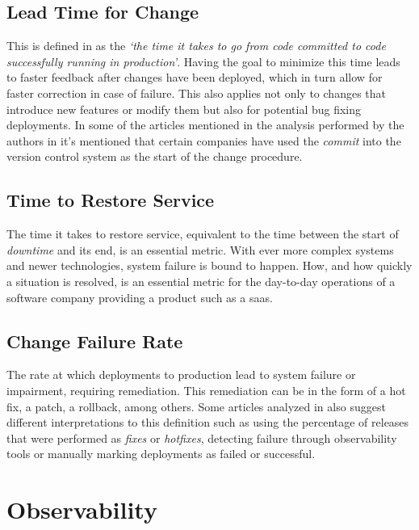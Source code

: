 \subsection{Lead Time for Change}\label{state-of-the-art:ss:lead-time-for-change}

This is defined in \parencite{48455} as the \textit{`the time it takes to go from code committed to code successfully running in production'}. Having the goal to minimize this time leads to faster feedback after changes have been deployed, which in turn allow for faster correction in case of failure. This also applies not only to changes that introduce new features or modify them but also for potential bug fixing deployments. In some of the articles mentioned in the analysis performed by the authors in \parencite{sallin_kropp_anslow_quilty_meier_2021} it's mentioned that certain companies have used the \textit{commit} into the version control system as the start of the change procedure.

\subsection{Time to Restore Service}\label{state-of-the-art:ss:time-to-restore-service}

The time it takes to restore service, equivalent to the time between the start of \textit{downtime} and its end, is an essential metric. With ever more complex systems and newer technologies, system failure is bound to happen. How, and how quickly a situation is resolved, is an essential metric for the day-to-day operations of a software company providing a product such as a \gls{saas}. 

\subsection{Change Failure Rate}\label{state-of-the-art:ss:change-failure-rate}

The rate at which deployments to production lead to system failure or impairment, requiring remediation. This remediation can be in the form of a hot fix, a patch, a rollback, among others. Some articles analyzed in \parencite{sallin_kropp_anslow_quilty_meier_2021} also suggest different interpretations to this definition such as using the percentage of releases that were performed as \textit{fixes} or \textit{hotfixes}, detecting failure through observability tools or manually marking deployments as failed or successful.


\section{Observability}\label{state-of-the-art:s:observability}

